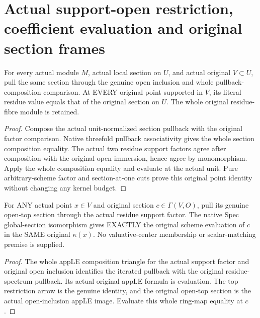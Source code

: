 \section{Actual support-open restriction, coefficient evaluation and original section frames}

\begin{definition}
\label{def:intrinsic-numerical-actual-support-section-restriction}
\leanok
{}
For every actual module $M$, actual local section on $U$, and actual
original $V\subset U$, pull the same section through the genuine open
inclusion and whole pullback-composition comparison. At EVERY original
point supported in $V$, its literal residue value equals that of the
original section on $U$. The whole original residue-fibre module is retained.
\end{definition}
\begin{proof}
Compose the actual unit-normalized section pullback with the original factor
comparison. Native threefold pullback associativity gives the whole section
composition equality. The actual two residue support factors agree after
composition with the original open immersion, hence agree by monomorphism.
Apply the whole composition equality and evaluate at the actual unit. Pure
arbitrary-scheme factor and section-at-one cuts prove this original point
identity without changing any kernel budget.
\end{proof}

\begin{lemma}
\label{lem:intrinsic-numerical-support-factor-coefficient-evaluation}
\leanok
{}
For ANY actual point $x\in V$ and original section $c\in\Gamma(V,O)$,
pull its genuine open-top section through the actual residue support factor.
The native Spec global-section isomorphism gives EXACTLY the original
scheme evaluation of $c$ in the SAME original $\kappa(x)$.
No valuative-center membership or scalar-matching premise is supplied.
\end{lemma}
\begin{proof}
The whole appLE composition triangle for the actual support factor and
original open inclusion identifies the iterated pullback with the original
residue-spectrum pullback. Its actual original appLE formula is evaluation.
The top restriction arrow is the genuine identity, and the original
open-top section is the actual open-inclusion appLE image. Evaluate this
whole ring-map equality at $c$.
\end{proof}

